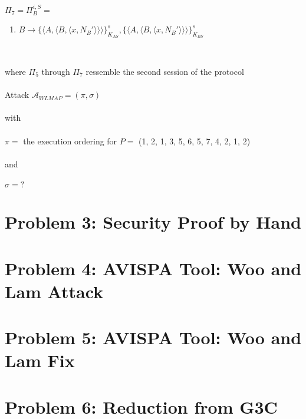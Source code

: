 \documentclass[12pt,pdftex,a4paper]{article}
\newcommand\tab[1][1cm]{\hspace*{#1}}
\begin{document}
$\Pi_7 = \Pi_B^{i,S} =$
\begin{enumerate}
\item \tab $ B \rightarrow \{\langle A, \langle B, \langle x, N_B' \rangle\rangle\rangle\}_{K_{AS}}^s, \{\langle A, \langle B, \langle x, N_B' \rangle\rangle\rangle\}_{K_{BS}}^s $
\end{enumerate}\

where $\Pi_5$ through $\Pi_7$ ressemble the second session of the protocol\\~\\
Attack $\mathcal{A}_{WLMAP} = (\pi, \sigma) $ \\~\\
with\\~\\
$\pi = $ the execution ordering for $ P =$ (1, 2, 1, 3, 5, 6, 5, 7, 4, 2, 1, 2) \\~\\
and \\~\\
$\sigma =? $


\section*{Problem 3: Security Proof by Hand}

\section*{Problem 4: AVISPA Tool: Woo and Lam Attack}

\section*{Problem 5: AVISPA Tool: Woo and Lam Fix}

\section*{Problem 6: Reduction from G3C}
\end{document}
